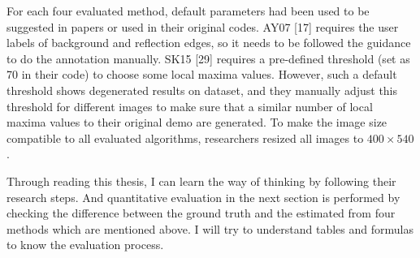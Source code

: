 \documentclass{article}
\begin{document}
  For each four evaluated method, default parameters had been used to be suggested in papers or used in their original codes. AY07 [17] requires the user labels of background and reflection edges, so it needs to be followed the guidance to do the annotation manually. SK15 [29] requires a pre-defined threshold (set as 70 in their code) to choose some local maxima values. However, such a default threshold shows degenerated results on dataset, and they manually adjust this threshold for different images to make sure that a similar number of local maxima values to their original demo are generated. To make the image size compatible to all evaluated algorithms, researchers resized all images to $400\times540$.

  Through reading this thesis, I can learn the way of thinking by following their research steps. And quantitative evaluation in the next section is performed by checking the difference between the ground truth and the estimated from four methods which are mentioned above. I will try to understand tables and formulas to know the evaluation process.
  


\begin{thebibliography}{60}
\end{thebibliography}
\end{document}
